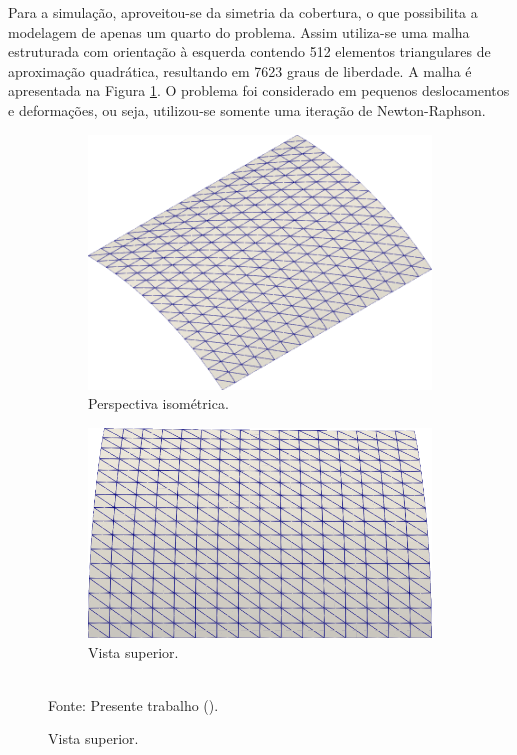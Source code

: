 Para a simulação, aproveitou-se da simetria da cobertura, o que possibilita a modelagem de apenas um quarto do problema. Assim utiliza-se uma malha estruturada com orientação à esquerda contendo 512 elementos triangulares de aproximação quadrática, resultando em 7623 graus de liberdade. A malha é apresentada na Figura \ref{fig:scordelis-mesh}. O problema foi considerado em pequenos deslocamentos e deformações, ou seja, utilizou-se somente uma iteração de Newton-Raphson.

\begin{figure}[h!]
    \centering
    \caption{\textit{Scordelis-Lo roof} - Malha utilizada.}
    \begin{subfigure}{0.35\textwidth}
        \includegraphics[width=\linewidth]{Figuras/scordelis/malha1.png}
        \caption{Perspectiva isométrica.}
    \end{subfigure}
    \begin{subfigure}{0.35\textwidth}
        \includegraphics[width=\linewidth]{Figuras/scordelis/malha2.png}
        \caption{Vista superior.}
    \end{subfigure}
    \\Fonte: Presente trabalho (\the\year).
    \label{fig:scordelis-mesh}
\end{figure}

